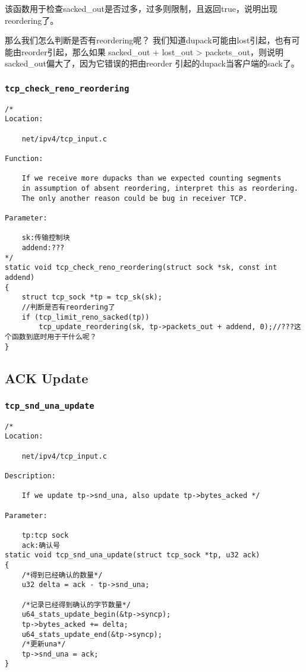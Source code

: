      该函数用于检查sacked\_out是否过多，过多则限制，且返回true，说明出现reordering了。

    那么我们怎么判断是否有reordering呢？ 我们知道dupack可能由lost引起，也有可能由reorder引起，那么如果 
    sacked\_out + lost\_out > packets\_out，则说明sacked\_out偏大了，因为它错误的把由reorder 
    引起的dupack当客户端的sack了。

        \subsubsection{\texttt{tcp_check_reno_reordering}}
\begin{verbatim}
/* 
Location:
    
    net/ipv4/tcp_input.c

Function:

    If we receive more dupacks than we expected counting segments
    in assumption of absent reordering, interpret this as reordering.
    The only another reason could be bug in receiver TCP.

Parameter:

    sk:传输控制块
    addend:???
*/
static void tcp_check_reno_reordering(struct sock *sk, const int addend)
{
    struct tcp_sock *tp = tcp_sk(sk);
    //判断是否有reordering了
    if (tcp_limit_reno_sacked(tp))
        tcp_update_reordering(sk, tp->packets_out + addend, 0);//???这个函数到底时用于干什么呢？
}
\end{verbatim}
    \subsection{ACK Update}
        \subsubsection{\texttt{tcp_snd_una_update}}
            \label{ACKUpdate:tcp_snd_una_update}
\begin{verbatim}
/* 
Location:

    net/ipv4/tcp_input.c

Description:

    If we update tp->snd_una, also update tp->bytes_acked */

Parameter:
    
    tp:tcp sock
    ack:确认号
static void tcp_snd_una_update(struct tcp_sock *tp, u32 ack)
{
    /*得到已经确认的数量*/
    u32 delta = ack - tp->snd_una;

    /*记录已经得到确认的字节数量*/
    u64_stats_update_begin(&tp->syncp);
    tp->bytes_acked += delta;
    u64_stats_update_end(&tp->syncp);
    /*更新una*/
    tp->snd_una = ack;
}
\end{verbatim}


